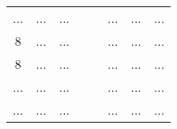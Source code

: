 \begin{table}[H]
\begin{tabular}{|c|c|c|lllll}
		...                       & ...                         & ...                         &                    & \multicolumn{1}{l|}{} & \multicolumn{1}{l|}{...}                       & \multicolumn{1}{l|}{...}                         & \multicolumn{1}{l|}{...} \\ \cline{1-3} \cline{6-8} 
		\cellcolor[HTML]{9AFF99}8 & \cellcolor[HTML]{9AFF99}... & \cellcolor[HTML]{9AFF99}... &                    & \multicolumn{1}{l|}{} & \multicolumn{1}{l|}{...}                       & \multicolumn{1}{l|}{...}                         & \multicolumn{1}{l|}{...} \\ \cline{1-3} \cline{6-8} 
		\cellcolor[HTML]{9AFF99}8 & \cellcolor[HTML]{9AFF99}... & \cellcolor[HTML]{9AFF99}... &                    & \multicolumn{1}{l|}{} & \multicolumn{1}{l|}{...}                       & \multicolumn{1}{l|}{...}                         & \multicolumn{1}{l|}{...} \\ \cline{1-3} \cline{6-8} 
		...                       & ...                         & ...                         &                    & \multicolumn{1}{l|}{} & \multicolumn{1}{l|}{...}                       & \multicolumn{1}{l|}{...}                         & \multicolumn{1}{l|}{...} \\ \cline{1-3} \cline{6-8} 
		...                       & ...                         & ...                         & \multirow{-5}{*}{} & \multicolumn{1}{l|}{} & \multicolumn{1}{l|}{...}                       & \multicolumn{1}{l|}{...}                         & \multicolumn{1}{l|}{...} \\ \cline{1-3} \cline{6-8} 
	\end{tabular}
\end{table}
